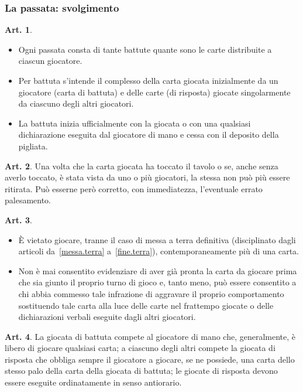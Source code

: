 \documentclass[italian,a4paper]{book}
\theoremstyle{definition}
\newtheorem{art}{Art.}
\newenvironment{packeditem}{
\begin{itemize}
  \setlength{\itemsep}{1pt}
  \setlength{\parskip}{0pt}
  \setlength{\parsep}{0pt}
}{\end{itemize}}
\begin{document}
\subsubsection{La passata: svolgimento}
\begin{art} \hspace*{\fill}
    \begin{packeditem}
\item Ogni passata consta di tante battute quante sono le carte distribuite a ciascun giocatore.
\item Per battuta s'intende il complesso della carta giocata inizialmente da un giocatore (carta di battuta) e delle carte (di risposta) giocate singolarmente da ciascuno degli altri giocatori.
\item La battuta inizia ufficialmente con la giocata o con una qualsiasi dichiarazione eseguita dal giocatore di mano e cessa con il deposito della pigliata.
    \end{packeditem}
\end{art}
\begin{art}
    Una volta che la carta giocata ha toccato il tavolo o se, anche senza averlo toccato, è stata vista da uno o più giocatori, la stessa non può più essere ritirata. Può esserne però corretto, con immediatezza, l'eventuale errato palesamento.
\end{art}
\begin{art}   \hspace*{\fill}
    \begin{packeditem}
\item \`E vietato giocare, tranne il caso di messa a terra definitiva
    (disciplinato dagli articoli da~\ref{messa.terra} a~\ref{fine.terra}), contemporaneamente più di una carta.
\item Non è mai consentito evidenziare di aver già pronta la carta da giocare prima che sia giunto il proprio turno di gioco e, tanto meno, può essere consentito a chi abbia commesso tale infrazione di aggravare il proprio comportamento sostituendo tale carta alla luce delle carte nel frattempo giocate o delle dichiarazioni verbali eseguite dagli altri giocatori.
    \end{packeditem}
\end{art}
\begin{art}
    La giocata di battuta compete al giocatore di mano che, generalmente, è libero di giocare qualsiasi carta; a ciascuno degli altri compete la giocata di risposta che obbliga sempre il giocatore a giocare, se ne possiede, una carta dello stesso palo della carta della giocata di battuta; le giocate di risposta devono essere eseguite ordinatamente in senso antiorario.
\end{art}
\end{document}

